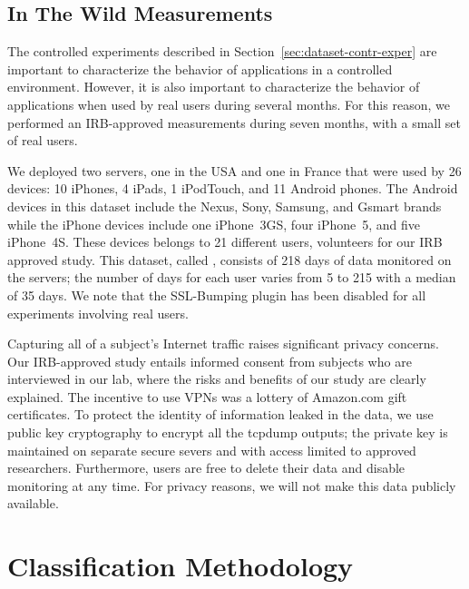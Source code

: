 
\subsection{In The Wild Measurements}
\label{sec:dataset-wild-measurements}

The controlled experiments described in
Section~\ref{sec:dataset-contr-exper} are important to characterize
the behavior of applications in a controlled environment. However, it
is also important to characterize the behavior of applications when
used by real users during several months. For this reason, we
performed an IRB-approved measurements during seven months,  with a small set of real users.

We deployed two \platname servers, one in the USA and one in France
that were used by 26 devices: 10 iPhones, 4 iPads, 1 iPodTouch, and 11
Android phones.  The Android devices in this dataset include the
Nexus, Sony, Samsung, and Gsmart brands while the iPhone devices
include one iPhone~3GS, four iPhone~5, and five iPhone~4S.  These
devices belongs to 21 different users, volunteers for our IRB approved
study.  This dataset, called \mobWild, consists of 218 days of data
monitored on the \platname{} servers; the number of days for each user
varies from 5 to 215 with a median of 35 days.  We note that the
SSL-Bumping plugin has been disabled for all experiments involving
real users.

Capturing all of a subject's Internet traffic raises significant
privacy concerns.  Our IRB-approved study entails informed consent
from subjects who are interviewed in our lab, where the risks and
benefits of our study are clearly explained.  The incentive to use
VPNs was a lottery of Amazon.com gift certificates. To protect the
identity of information leaked in the data, we use public key
cryptography to encrypt all the tcpdump outputs; the private key is
maintained on separate secure severs and with access limited to
approved researchers.  Furthermore, users are free to delete their
data and disable monitoring at any time.  For privacy reasons, we will
not make this data publicly available.

\section{Classification Methodology}
\label{sec:classification-methodology}

